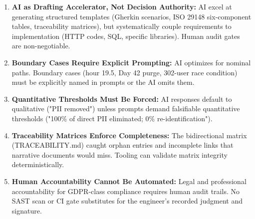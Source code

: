\documentclass[10pt,a4paper]{article}
\begin{document}
\begin{enumerate}[leftmargin=*]
 \item \textbf{AI as Drafting Accelerator, Not Decision Authority:} AI excel at generating structured templates (Gherkin scenarios, ISO 29148 six-component tables, traceability matrices), but systematically couple requirements to implementation (HTTP codes, SQL, specific libraries). Human audit gates are non-negotiable.
 \item \textbf{Boundary Cases Require Explicit Prompting:} AI optimizes for nominal paths. Boundary cases (hour 19.5, Day 42 purge, 302-user race condition) must be explicitly named in prompts or the AI omits them.
 \item \textbf{Quantitative Thresholds Must Be Forced:} AI responses default to qualitative ("PII removed") unless prompts demand falsifiable quantitative thresholds ("100\% of direct PII eliminated; 0\% re-identification").
 \item \textbf{Traceability Matrices Enforce Completeness:} The bidirectional matrix (TRACEABILITY.md) caught orphan entries and incomplete links that narrative documents would miss. Tooling can validate matrix integrity deterministically.
 \item \textbf{Human Accountability Cannot Be Automated:} Legal and professional accountability for GDPR-class compliance requires human audit trails. No SAST scan or CI gate substitutes for the engineer's recorded judgment and signature.
\end{enumerate}

\end{document}
